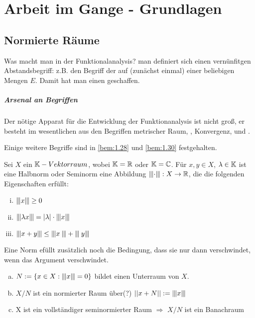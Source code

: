 \documentclass[ngerman]{report}
\begin{document}
\listoftodos
\tableofcontents
\listoftheorems

\chapter{Arbeit im Gange - Grundlagen}
\section{Normierte Räume}
{
\footnotesize
Was macht man in der Funktionalanalysis? man definiert sich einen vernünfitgen Abstandsbegriff: z.B. den Begriff der  auf (zunächst einmal) einer beliebigen Mengen $E$. Damit hat man einen  geschaffen.
}
\paragraph{Arsenal an Begriffen}
Der nötige Apparat für die Entwicklung der Funktionanalysis ist nicht groß,
er besteht im wesentlichen aus den Begriffen \gls{metrischer Raum},
, \gls{Konvergenz},  und .\par
Einige weitere Begriffe sind in \ref{bem:1.28} und \ref{bem:1.30} festgehalten.

\begin{definition}

	Sei $X$ ein $\mathbb{K}-Vektorraum$, wobei $\mathbb{K} = \mathbb{R}$ oder $\mathbb{K} = \mathbb{C}$. 
	Für $x,y\in X$, $\lambda \in \mathbb{K}$ ist eine Halbnorm oder Seminorm eine Abbildung
	$\interleave{\cdot}\interleave:X \rightarrow \mathbb{R}$, die die folgenden Eigenschaften erfüllt:

		\begin{enumerate}[(i)]
			\item $\interleave{x}\interleave\geq 0$
			\item $\interleave{\lambda x}\interleave = |\lambda|\cdot \interleave{x}\interleave$
			\item $\interleave{x+y}\interleave \leq \interleave{x}\interleave + \interleave{y}\interleave$
		\end{enumerate}
\end{definition}

Eine Norm efüllt zusätzlich noch die Bedingung, dass sie nur dann verschwindet, wenn das Argument verschwindet.

\begin{bem}
	\begin{enumerate}[(a)]
		\item $N:=\{x\in X: \interleave{x}\interleave=0\}$ bildet einen Unterraum von $X$.
		\item $X/N$ ist ein normierter Raum über(?) $\left\lvert \left\lvert x+N \right\rvert \right\rvert := \interleave{x}\interleave$
		\item X ist ein vollständiger seminormierter Raum $\Rightarrow$ $X/N$ ist ein Banachraum 
	\end{enumerate}
\end{bem}
\end{document}
